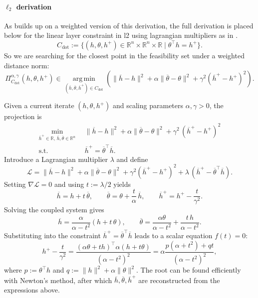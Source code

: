 \documentclass{article}
\let\cref\crtcref
\begin{document}
\paragraph{$\ell_2$ derivation}
As \cref{sec:matmul} builds up on a weighted version of this derivation, the full derivation is placed below for the linear layer constraint in l2 using lagrangian multipliers as in \cite{elser2019learning}.
\begin{equation}
  \label{eq:constraint-dot}
  C_{\mathrm{dot}} := \{(h, \theta, h^+)\in \mathbb{R}^n \times \mathbb{R}^n \times \mathbb{R} \mid \theta^\top h = h^+\}.
\end{equation}
So we are searching for the closest point in the feasibility set under a weighted distance norm:
\[
\Pi_{C_{\mathrm{dot}}}^{\alpha, \gamma}(h, \theta, h^+) \in \operatorname*{arg\,min}_{(\overline{h}, \overline{\theta}, \overline{h}^+) \in C_{\mathrm{dot}}} \left( \lVert \overline{h}-h \rVert^2 + \alpha\lVert \overline{\theta}-\theta \rVert^2 + \gamma^2(\overline{h}^+ - h^+)^2 \right).
\]

Given a current iterate $(h, \theta, h^+)$ and scaling parameters $\alpha, \gamma>0$, the projection is
\begin{equation}
  \label{eq:proj-bilinear-layer}
  \begin{aligned}
    \min_{\overline{h}^+\in\mathbb{R},\,\overline{h},\overline{\theta}\in\mathbb{R}^n}\; &\ \lVert \overline{h}-h\rVert^2 + \alpha\lVert \overline{\theta}-\theta\rVert^2 + \gamma^2\,(\overline{h}^+-h^+)^2\\
    \text{s.t. } &\ \overline{h}^+ = \overline{\theta}^\top \overline{h}.
  \end{aligned}
\end{equation}
Introduce a Lagrangian multiplier $\lambda$ and define
\[
  \mathcal{L} = \lVert \overline{h}-h\rVert^2 + \alpha\lVert \overline{\theta}-\theta\rVert^2 + \gamma^2(\overline{h}^+-h^+)^2 + \lambda\,(\overline{h}^+ - \overline{\theta}^\top \overline{h}).
\]
Setting $\nabla \mathcal{L} = 0$ and using $t:=\lambda/2$ yields
\[
  \overline{h} = h + t\,\overline{\theta},\qquad \overline{\theta} = \theta + \frac{t}{\alpha}\,\overline{h},\qquad \overline{h}^+ = h^+ - \frac{t}{\gamma^2}.
\]
Solving the coupled system gives
\[
  \overline{h} = \frac{\alpha}{\alpha-t^2}(h + t\,\theta),\qquad \overline{\theta} = \frac{\alpha\theta }{\alpha-t^2} +  \frac{t\,h}{\alpha-t^2} .
\]
Substituting into the constraint $\overline{h}^+=\overline{\theta}^\top \overline{h}$ leads to a scalar equation $f(t)=0$:
\[
  h^+ - \frac{t}{\gamma^2} 
  = \frac{(\alpha\theta+t h)^\top \alpha(h+t \theta)}{(\alpha-t^2)^2} 
  = \alpha \frac{p(\alpha+t^2)+q t}{(\alpha-t^2)^2},
\]
where $p:=\theta^\top h$ and $q:=\lVert h\rVert^2 + \alpha\lVert \theta\rVert^2$.
The root can be found efficiently with Newton's method, after which $\overline{h}, \overline{\theta}, \overline{h}^+$ are reconstructed from the expressions above.
\end{document}
